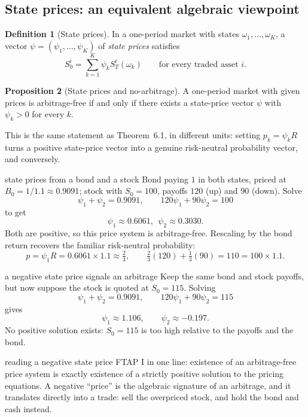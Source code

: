 \documentclass[10pt]{article}
\newcommand{\1}{\mathbf 1}
\theoremstyle{definition}
\newtheorem{definition}{Definition}[section]
\newtheorem{proposition}[definition]{Proposition}
\begin{document}
\subsection{State prices: an equivalent algebraic viewpoint}

\begin{definition}[State prices]
In a one-period market with states \(\omega_1,\ldots,\omega_K\), a vector
\(\psi=(\psi_1,\ldots,\psi_K)\) of \emph{state prices} satisfies
\[
S_0^i=\sum_{k=1}^K\psi_kS_T^i(\omega_k)
\qquad\text{for every traded asset }i.
\]
\end{definition}

\begin{proposition}[State prices and no-arbitrage]
A one-period market with given prices is arbitrage-free if and only if there
exists a state-price vector \(\psi\) with \(\psi_k>0\) for every \(k\).
\end{proposition}

This is the same statement as Theorem~6.1, in different units: setting
\(p_k=\psi_kR\) turns a positive state-price vector into a genuine
risk-neutral probability vector, and conversely.

\begin{boardexample}{state prices from a bond and a stock}
Bond paying \(1\) in both states, priced at \(B_0=1/1.1\approx0.9091\); stock
with \(S_0=100\), payoffs \(120\) (up) and \(90\) (down). Solve
\[
\psi_1+\psi_2=0.9091,
\qquad
120\psi_1+90\psi_2=100
\]
to get
\[
\boxed{\psi_1\approx0.6061,\ \ \psi_2\approx0.3030.}
\]
Both are positive, so this price system is arbitrage-free. Rescaling by the
bond return recovers the familiar risk-neutral probability:
\[
p=\psi_1R=0.6061\times1.1\approx\tfrac23,
\qquad
\tfrac23(120)+\tfrac13(90)=110=100\times1.1.
\]
\end{boardexample}

\begin{boardexample}{a negative state price signals an arbitrage}
Keep the same bond and stock payoffs, but now suppose the stock is quoted at
\(S_0=115\). Solving
\[
\psi_1+\psi_2=0.9091,
\qquad
120\psi_1+90\psi_2=115
\]
gives
\[
\psi_1\approx1.106,
\qquad
\psi_2\approx-0.197.
\]
No positive solution exists: \(S_0=115\) is too high relative to the payoffs
and the bond.
\end{boardexample}

\begin{warningbox}{reading a negative state price}
FTAP I in one line: existence of an arbitrage-free price system is exactly
existence of a strictly positive solution to the pricing equations. A
negative ``price'' is the algebraic signature of an arbitrage, and it
translates directly into a trade: sell the overpriced stock, and hold the
bond and cash instead.
\end{warningbox}
\end{document}
